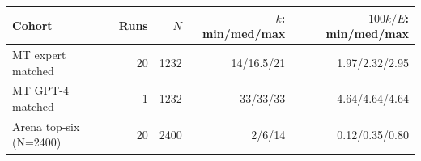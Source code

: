 \begin{tabular}{lrrrr}
\toprule
Cohort & Runs & $N$ & $k$: min/med/max & $100k/E$: min/med/max \\
\midrule
MT expert matched & 20 & 1232 & 14/16.5/21 & 1.97/2.32/2.95 \\
MT GPT-4 matched & 1 & 1232 & 33/33/33 & 4.64/4.64/4.64 \\
Arena top-six (N=2400) & 20 & 2400 & 2/6/14 & 0.12/0.35/0.80 \\
\bottomrule
\end{tabular}
